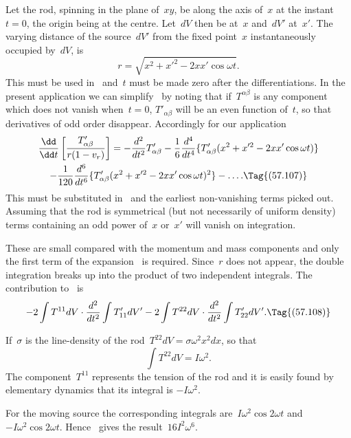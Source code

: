 \documentclass[12pt]{book}
\begin{document}
Let the rod, spinning in the plane of~$xy$, be along the axis of~$x$ at the instant~$t=0$, the origin being at
the centre.
Let~$dV$ then be at~$x$ and~$dV'$ at~$x'$.
The varying distance of the source~$dV'$ from the fixed point~$x$ instantaneously occupied by~$dV$, is
\[
r=\sqrt{x^2 + x'^2 - 2 x x' \cos\omega t}.
\]
This must be used in~ and~$t$ must be made zero after the differentiations.
In the present application we can simplify~ by noting that if~$T^{\alpha\beta}$ is any component
which does not vanish when~$t=0$, $T'_{\alpha\beta}$ will be an even function of~$t$,
so that derivatives of odd order disappear.
Accordingly for our application
\begin{multline*}
\frac{\dd}{\dd t}\left[\frac{T'_{\alpha\beta}}{r(1-v_r)}\right] = -\frac{d^2}{dt^2}T'_{\alpha\beta} -
                        \frac{1}{6}\frac{d^4}{dt^4}\{T'_{\alpha\beta}(x^2 + x'^2 - 2 x x' \cos\omega t)\}\\
                   -\frac{1}{120}\frac{d^6}{dt^6}\{T'_{\alpha\beta}(x^2 + x'^2 - 2 x x' \cos\omega t)^2\} - \ldots.
\Tag{(57.107)}
\end{multline*}
This must be substituted in~ and the earliest non-vanishing terms picked out.
Assuming that the rod is symmetrical (but not necessarily of uniform density) terms containing an
odd power of~$x$ or~$x'$ will vanish on integration.


These are small compared with the momentum and mass components and only the first term of the expansion~
is required.
Since~$r$ does not appear, the double integration breaks up into the product of two independent integrals.
The contribution to~ is
\[
-2\int T^{11} dV \cdot \frac{d^2}{dt^2}\int T'_{11} dV' - 2\int T^{22} dV \cdot \frac{d^2}{dt^2}\int T'_{22} dV'.
\Tag{(57.108)}
\]

If~$\sigma$ is the line-density of the rod~$T^{22} dV = \sigma\omega^2 x^2 dx$, so that
\[
\int T^{22} dV = I\omega^2.
\]
The component~$T^{11}$ represents the tension of the rod and it is easily found by elementary dynamics that its
integral is $-I\omega^2$.

For the moving source the corresponding integrals are~$I\omega^2\cos 2\omega t$ and~$-I\omega^2\cos 2\omega t$.
Hence~ gives the result~$16I^2\omega^6$.

\end{document}
